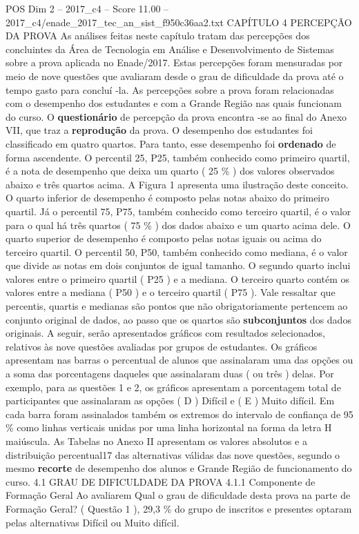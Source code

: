\begin{textsample}{POS Dim 2 – 2017\_c4 – Score 11.00 – 2017\_c4/enade\_2017\_tec\_an\_sist\_f950c36aa2.txt}  \label{ex:f2_pos_100}
CAPÍTULO 4 PERCEPÇÃO DA PROVA As análises feitas neste capítulo tratam das percepções dos concluintes da Área de Tecnologia em Análise e Desenvolvimento de Sistemas sobre a prova aplicada no Enade/2017.
Estas percepções foram mensuradas por meio de nove questões que avaliaram desde o grau de dificuldade da prova até o tempo gasto para concluí -la.
As percepções sobre a prova foram relacionadas com o desempenho dos estudantes e com a Grande Região nas quais funcionam do curso.
O \textbf{questionário} de percepção da prova encontra -se ao final do Anexo VII, que traz a \textbf{reprodução} da prova.
O desempenho dos estudantes foi classificado em quatro quartos.
Para tanto, esse desempenho foi \textbf{ordenado} de forma ascendente.
O percentil 25, P25, também conhecido como primeiro quartil, é a nota de desempenho que deixa um quarto ( 25 \% ) dos valores observados abaixo e três quartos acima.
A Figura 1 apresenta uma ilustração deste conceito.
O quarto inferior de desempenho é composto pelas notas abaixo do primeiro quartil.
Já o percentil 75, P75, também conhecido como terceiro quartil, é o valor para o qual há três quartos ( 75 \% ) dos dados abaixo e um quarto acima dele.
O quarto superior de desempenho é composto pelas notas iguais ou acima do terceiro quartil.
O percentil 50, P50, também conhecido como mediana, é o valor que divide as notas em dois conjuntos de igual tamanho.
O segundo quarto inclui valores entre o primeiro quartil ( P25 ) e a mediana.
O terceiro quarto contém os valores entre a mediana ( P50 ) e o terceiro quartil ( P75 ).
Vale ressaltar que percentis, quartis e medianas são pontos que não obrigatoriamente pertencem ao conjunto original de dados, ao passo que os quartos são \textbf{subconjuntos} dos dados originais.
A seguir, serão apresentados gráficos com resultados selecionados, relativos às nove questões avaliadas por grupos de estudantes.
Os gráficos apresentam nas barras o percentual de alunos que assinalaram uma das opções ou a soma das porcentagens daqueles que assinalaram duas ( ou três ) delas.
Por exemplo, para as questões 1 e 2, os gráficos apresentam a porcentagem total de participantes que assinalaram as opções ( D ) Difícil e ( E ) Muito difícil.
Em cada barra foram assinalados também os extremos do intervalo de confiança de 95 \% como linhas verticais unidas por uma linha horizontal na forma da letra H maiúscula.
As Tabelas no Anexo II apresentam os valores absolutos e a distribuição percentual17 das alternativas válidas das nove questões, segundo o mesmo \textbf{recorte} de desempenho dos alunos e Grande Região de funcionamento do curso. 4.1 GRAU DE DIFICULDADE DA PROVA 4.1.1 Componente de Formação Geral Ao avaliarem Qual o grau de dificuldade desta prova na parte de Formação Geral? ( Questão 1 ), 29,3 \% do grupo de inscritos e presentes optaram pelas alternativas Difícil ou Muito difícil.

\end{textsample}

